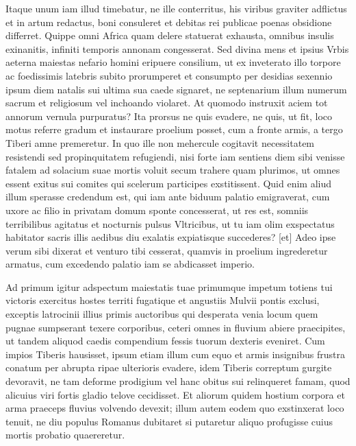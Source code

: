 Itaque unum iam illud timebatur, ne ille conterritus, his viribus graviter adflictus et in artum redactus, boni consuleret et debitas rei publicae poenas obsidione differret. Quippe omni Africa quam delere statuerat exhausta, omnibus insulis exinanitis, infiniti temporis annonam congesserat. Sed divina mens et ipsius Vrbis aeterna maiestas nefario homini eripuere consilium, ut ex inveterato illo torpore ac foedissimis latebris subito prorumperet et consumpto per desidias sexennio ipsum diem natalis sui ultima sua caede signaret, ne septenarium illum numerum sacrum et religiosum vel inchoando violaret. At quomodo instruxit aciem tot annorum vernula purpuratus? Ita prorsus ne quis evadere, ne quis, ut fit, loco motus referre gradum et instaurare proelium posset, cum a fronte armis, a tergo Tiberi amne premeretur. In quo ille non mehercule cogitavit necessitatem resistendi sed propinquitatem refugiendi, nisi forte iam sentiens diem sibi venisse fatalem ad solacium suae mortis voluit secum trahere quam plurimos, ut omnes essent exitus sui comites qui scelerum participes exstitissent.  Quid enim aliud illum sperasse credendum est, qui iam ante biduum palatio emigraverat, cum uxore ac filio in privatam domum sponte concesserat, ut res est, somniis terribilibus agitatus et nocturnis pulsus Vltricibus, ut tu iam olim exspectatus habitator sacris illis aedibus diu exalatis expiatisque succederes? [et] Adeo ipse verum sibi dixerat et venturo tibi cesserat, quamvis in proelium ingrederetur armatus, cum excedendo palatio iam se abdicasset imperio.

Ad primum igitur adspectum maiestatis tuae primumque impetum totiens tui victoris exercitus hostes territi fugatique et angustiis Mulvii pontis exclusi, exceptis latrocinii illius primis auctoribus qui desperata venia locum quem pugnae sumpserant texere corporibus, ceteri omnes in fluvium abiere praecipites, ut tandem aliquod caedis compendium fessis tuorum dexteris eveniret. Cum impios Tiberis hausisset, ipsum etiam illum cum equo et armis insignibus frustra conatum per abrupta ripae ulterioris evadere, idem Tiberis correptum gurgite devoravit, ne tam deforme prodigium vel hanc obitus sui relinqueret famam, quod alicuius viri fortis gladio telove cecidisset. Et aliorum quidem hostium corpora et arma praeceps fluvius volvendo devexit; illum autem eodem quo exstinxerat loco tenuit, ne diu populus Romanus dubitaret si putaretur aliquo profugisse cuius mortis probatio quaereretur.

